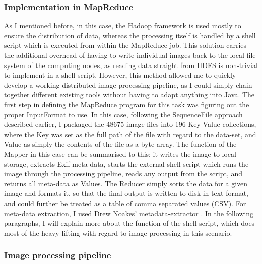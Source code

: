 \documentclass [12pt,a4paper]{report}
\begin{document}

\subsubsection{Implementation in MapReduce}

As I mentioned before, in this case, the Hadoop framework is used mostly to ensure the distribution of data, whereas the processing itself is handled by a shell script which is executed from within the MapReduce job. This solution carries the additional overhead of having to write individual images back to the local file system of the computing nodes, as reading data straight from HDFS is non-trivial to implement in a shell script. However, this method allowed me to quickly develop a working distributed image processing pipeline, as I could simply chain together different existing tools without having to adapt anything into Java.
The first step in defining the MapReduce program for this task was figuring out the proper InputFormat to use. In this case, following the SequenceFile approach described earlier, I packaged the 48675 image files into 196 Key-Value collections, where the Key was set as the full path of the file with regard to the data-set, and Value as simply the contents of the file as a byte array.
The function of the Mapper in this case can be summarised to this: it writes the image to local storage, extracts Exif meta-data, starts the external shell script which runs the image through the processing pipeline, reads any output from the script, and returns all meta-data as Values. The Reducer simply sorts the data for a given image and formats it, so that the final output is written to disk in text format, and could further be treated as a table of comma separated values (CSV). For meta-data extraction, I used Drew Noakes' metadata-extractor \cite{metadataextractor}. In the following paragraphs, I will explain more about the function of the shell script, which does most of the heavy lifting with regard to image processing in this scenario.

\subsubsection{Image processing pipeline}
\end{document}
